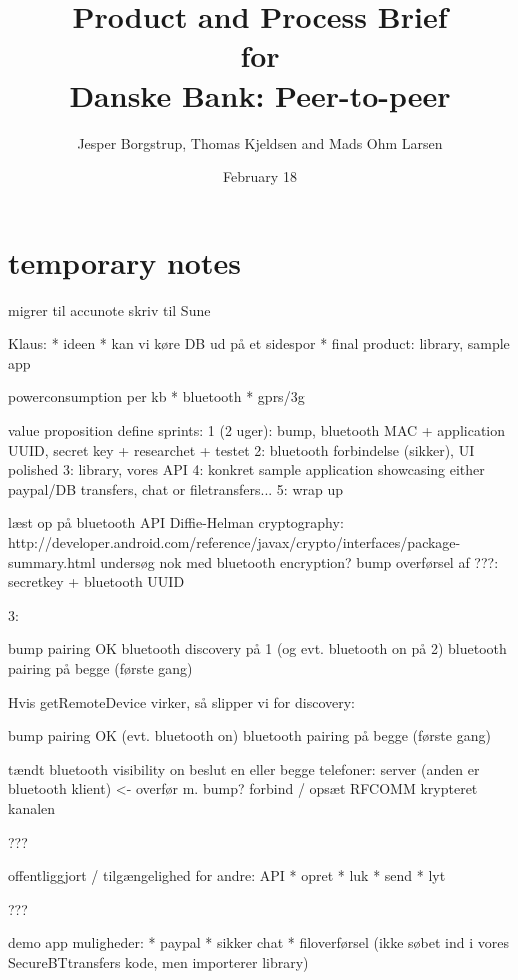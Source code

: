 \documentclass[a4paper,11pt]{article}
\title{Product and Process Brief\\\small{for}\\\small{Danske Bank: Peer-to-peer}}
\author{ Jesper Borgstrup, Thomas Kjeldsen and Mads Ohm Larsen }
\date{February 18}
\begin{document}
\ifpdf
{}
\else
{}
\fi

\maketitle

\tableofcontents
\vspace{2cm}

\section{temporary notes}

migrer til accunote
skriv til Sune


Klaus:
* ideen
* kan vi køre DB ud på et sidespor
* final product: library, sample app



powerconsumption per kb
* bluetooth
* gprs/3g

value proposition
define sprints:
1 (2 uger): bump, bluetooth MAC + application UUID, secret key + researchet + testet
2: bluetooth forbindelse (sikker), UI polished
3: library, vores API
4: konkret sample application showcasing either paypal/DB transfers, chat or filetransfers...
5: wrap up

læst op på bluetooth API
Diffie-Helman cryptography: http://developer.android.com/reference/javax/crypto/interfaces/package-summary.html
undersøg nok med bluetooth encryption?
bump overførsel af ???: secretkey + bluetooth UUID


3:

bump pairing OK
bluetooth discovery på 1 (og evt. bluetooth on på 2)
bluetooth pairing på begge (første gang)


Hvis getRemoteDevice virker, så slipper vi for discovery:

bump pairing OK
(evt. bluetooth on)
bluetooth pairing på begge (første gang)


tændt bluetooth
visibility on
beslut en eller begge telefoner: server (anden er bluetooth klient) <- overfør m. bump?
forbind / opsæt RFCOMM
krypteret kanalen

???

offentliggjort / tilgængelighed for andre: API
* opret
* luk
* send
* lyt

???

demo app muligheder:
* paypal
* sikker chat
* filoverførsel
(ikke søbet ind i vores SecureBTtransfers kode, men importerer library)
\end{document}
